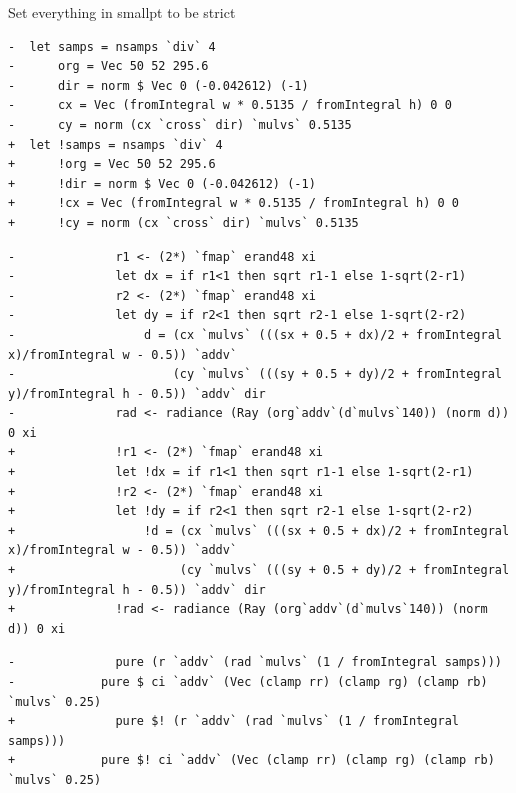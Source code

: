 \documentclass[8pt]{beamer}
\begin{document}
\begin{frame}[fragile]{Set everything in smallpt to be strict}
\begin{verbatim}
-  let samps = nsamps `div` 4
-      org = Vec 50 52 295.6
-      dir = norm $ Vec 0 (-0.042612) (-1)
-      cx = Vec (fromIntegral w * 0.5135 / fromIntegral h) 0 0
-      cy = norm (cx `cross` dir) `mulvs` 0.5135
+  let !samps = nsamps `div` 4
+      !org = Vec 50 52 295.6
+      !dir = norm $ Vec 0 (-0.042612) (-1)
+      !cx = Vec (fromIntegral w * 0.5135 / fromIntegral h) 0 0
+      !cy = norm (cx `cross` dir) `mulvs` 0.5135

\end{verbatim}

\begin{verbatim}
-              r1 <- (2*) `fmap` erand48 xi
-              let dx = if r1<1 then sqrt r1-1 else 1-sqrt(2-r1)
-              r2 <- (2*) `fmap` erand48 xi
-              let dy = if r2<1 then sqrt r2-1 else 1-sqrt(2-r2)
-                  d = (cx `mulvs` (((sx + 0.5 + dx)/2 + fromIntegral x)/fromIntegral w - 0.5)) `addv`
-                      (cy `mulvs` (((sy + 0.5 + dy)/2 + fromIntegral y)/fromIntegral h - 0.5)) `addv` dir
-              rad <- radiance (Ray (org`addv`(d`mulvs`140)) (norm d)) 0 xi
+              !r1 <- (2*) `fmap` erand48 xi
+              let !dx = if r1<1 then sqrt r1-1 else 1-sqrt(2-r1)
+              !r2 <- (2*) `fmap` erand48 xi
+              let !dy = if r2<1 then sqrt r2-1 else 1-sqrt(2-r2)
+                  !d = (cx `mulvs` (((sx + 0.5 + dx)/2 + fromIntegral x)/fromIntegral w - 0.5)) `addv`
+                       (cy `mulvs` (((sy + 0.5 + dy)/2 + fromIntegral y)/fromIntegral h - 0.5)) `addv` dir
+              !rad <- radiance (Ray (org`addv`(d`mulvs`140)) (norm d)) 0 xi
\end{verbatim}

\begin{verbatim}
-              pure (r `addv` (rad `mulvs` (1 / fromIntegral samps)))
-            pure $ ci `addv` (Vec (clamp rr) (clamp rg) (clamp rb) `mulvs` 0.25)
+              pure $! (r `addv` (rad `mulvs` (1 / fromIntegral samps)))
+            pure $! ci `addv` (Vec (clamp rr) (clamp rg) (clamp rb) `mulvs` 0.25)
\end{verbatim}


\end{frame}
\end{document}

